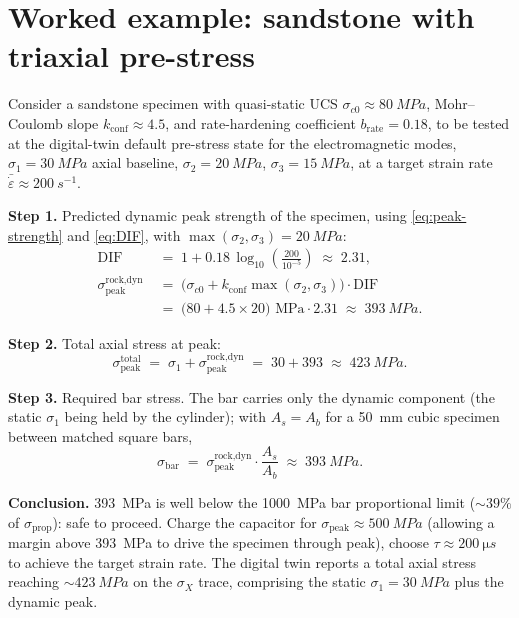 \documentclass[11pt,a4paper,openany]{book}
\providecommand{\SI}[2]{\qty{#1}{#2}}
\theoremstyle{handbook}
\newcommand{\sig}{\sigma}
\newcommand{\eps}{\varepsilon}
\newcommand{\epsdot}{\dot\eps}
\newcommand{\Ab}{A_b}
\newcommand{\As}{A_s}
\newcommand{\sigprop}{\sig_{\text{prop}}}
\newcommand{\sigpeak}{\sig_{\text{peak}}}
\begin{document}
\section{Worked example: sandstone with triaxial pre-stress}

Consider a sandstone specimen with quasi-static UCS $\sig_{c0}\approx
\SI{80}{MPa}$, Mohr--Coulomb slope $k_{\text{conf}}\approx 4.5$, and
rate-hardening coefficient $b_{\text{rate}}=0.18$, to be tested at the
digital-twin default pre-stress state for the electromagnetic modes,
$\sig_1=\SI{30}{MPa}$ axial baseline, $\sig_2=\SI{20}{MPa}$,
$\sig_3=\SI{15}{MPa}$, at a target strain rate
$\bar\epsdot\approx\SI{200}{s^{-1}}$.

\textbf{Step 1.} Predicted dynamic peak strength of the specimen, using
\eqref{eq:peak-strength} and \eqref{eq:DIF}, with
$\max(\sig_2,\sig_3)=\SI{20}{MPa}$:
\begin{align*}
  \text{DIF} &\;=\; 1 + 0.18\,\log_{10}\!\left(\frac{200}{10^{-5}}\right)
              \;\approx\; 2.31,\\[2pt]
  \sigpeak^{\text{rock,dyn}}
    &\;=\; \bigl(\sig_{c0}+k_{\text{conf}}\max(\sig_2,\sig_3)\bigr)\cdot\text{DIF} \\
    &\;=\; \bigl(80 + 4.5\times 20\bigr)\text{ MPa}\cdot 2.31
    \;\approx\; \SI{393}{MPa}.
\end{align*}

\textbf{Step 2.} Total axial stress at peak:
\begin{equation*}
  \sigpeak^{\text{total}} \;=\; \sig_1 + \sigpeak^{\text{rock,dyn}}
                          \;=\; 30 + 393 \;\approx\; \SI{423}{MPa}.
\end{equation*}

\textbf{Step 3.} Required bar stress. The bar carries only the dynamic
component (the static $\sig_1$ being held by the cylinder); with $\As=\Ab$
for a \SI{50}{mm} cubic specimen between matched square bars,
\begin{equation*}
  \sig_{\text{bar}} \;=\; \sigpeak^{\text{rock,dyn}}\cdot\frac{\As}{\Ab}
                    \;\approx\; \SI{393}{MPa}.
\end{equation*}

\textbf{Conclusion.} \SI{393}{MPa} is well below the \SI{1000}{MPa} bar
proportional limit ($\sim 39\%$ of $\sigprop$): safe to proceed. Charge
the capacitor for $\sigpeak\approx\SI{500}{MPa}$ (allowing a margin above
\SI{393}{MPa} to drive the specimen through peak), choose
$\tau\approx\SI{200}{\micro s}$ to achieve the target strain rate. The
digital twin reports a total axial stress reaching $\sim\SI{423}{MPa}$ on
the $\sig_X$ trace, comprising the static $\sig_1=\SI{30}{MPa}$ plus the
dynamic peak.
\end{document}
